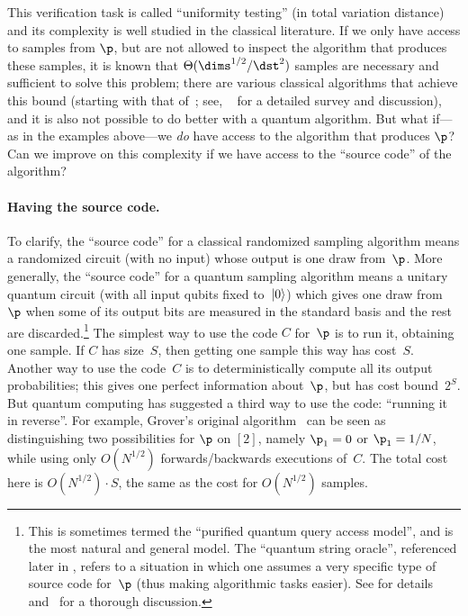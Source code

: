 \documentclass[11pt]{article}
\begin{document}
This verification task is called ``uniformity testing'' (in total variation distance) and its complexity is well studied in the classical literature. If we only have access to samples from $\p$, but are not allowed to inspect the algorithm that produces these samples, it is known that $\Theta(\dims^{1/2}/\dst^2)$ samples are necessary and sufficient to solve this problem; there are various classical algorithms that achieve this bound (starting with that of~\cite{Paninski08}; see, \eg~\cite{CanonneTopicsDT2022} for a detailed survey and discussion), and it is also not possible to do better with a quantum algorithm. But what if---as in the examples above---we \emph{do} have access to the algorithm that produces $\p$? Can we improve on this complexity if we have access to the ``source code'' of the algorithm? 

\paragraph{Having the source code.} To clarify, the ``source code'' for a classical randomized sampling algorithm means a randomized circuit (with no input) whose output is one draw from~$\p$.
More generally, the ``source code'' for a quantum sampling algorithm means a unitary quantum circuit (with all input qubits fixed to~$\ket{0}$) which gives one draw from~$\p$ when some of its output bits are measured in the standard basis and the rest are discarded.\footnote{This is sometimes termed the ``purified quantum query access model'', and is the most natural and general model.  The ``quantum string oracle'', referenced later in , refers to a situation in which one assumes a very specific type of source code for~$\p$ (thus making algorithmic tasks easier). See  for details and~\cite{Bel19} for a thorough discussion.}
%
The simplest way to use the code $C$ for~$\p$ is to run it, obtaining one sample.  
If $C$ has size~$S$, then getting one sample this way has cost~$S$.  
Another way to use the code~$C$ is to deterministically compute all its output probabilities; this gives one perfect information about~$\p$, but has cost bound~$2^S$.  
But quantum computing has suggested a third way to use the code: ``running it in reverse''.  
For example, Grover's original algorithm~\cite{Gro96} can be seen as distinguishing two possibilities for $\p$ on $[2]$, namely $\p_1 = 0$ or $\p_1 = 1/N$, while using only $O(N^{1/2})$ forwards/backwards executions of~$C$.
The total cost here is $O(N^{1/2}) \cdot S$, the same as the cost for $O(N^{1/2})$ samples. 
\end{document}
